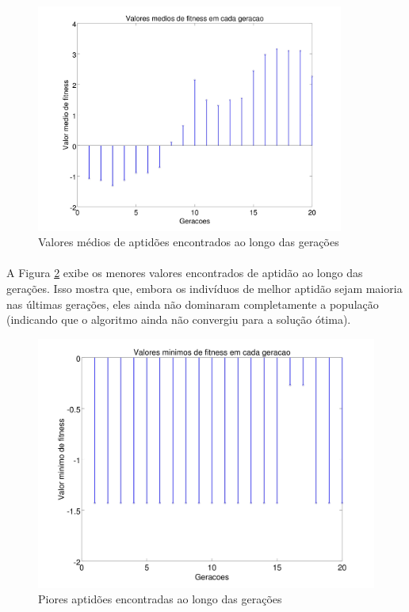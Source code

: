 \documentclass{report}
\begin{document}
	\begin{figure}[H]
		\centering
		\includegraphics[width=0.9\textwidth]{Q01_media_fitness.jpg}
		\caption{Valores médios de aptidões encontrados ao longo das gerações}
		\label{media_fitness}
	\end{figure}
	
	\paragraph{} A Figura \ref{piores_fitness} exibe os menores valores encontrados de aptidão ao longo das gerações. Isso mostra que, embora os indivíduos de melhor aptidão sejam maioria nas últimas gerações, eles ainda não dominaram completamente a população (indicando que o algoritmo ainda não convergiu para a solução ótima).\\
	
	\begin{figure}[H]
		\centering
		\includegraphics[width=\textwidth]{Q01_piores_fitness.jpg}
		\caption{Piores aptidões encontradas ao longo das gerações}
		\label{piores_fitness}
	\end{figure}
\end{document}
